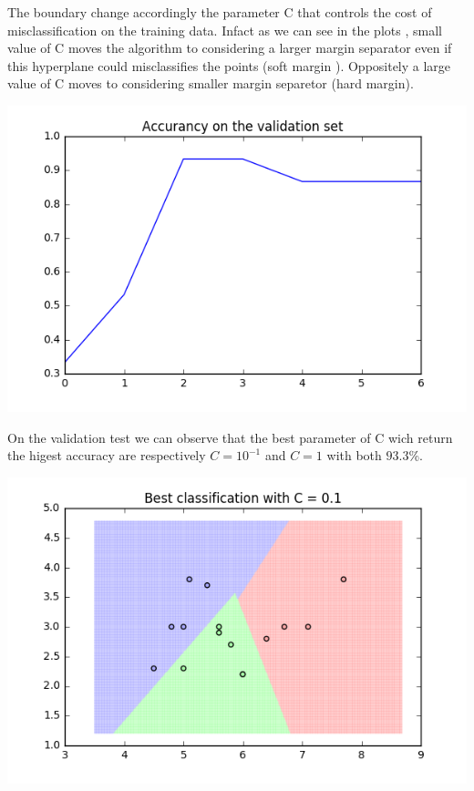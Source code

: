 \documentclass[11pt]{article}
\theoremstyle{plain}
\begin{document}
The boundary change accordingly the parameter C that controls the cost of misclassification on the training data. Infact as we can see in the plots , small value of C moves the algorithm to considering a larger margin separator even if this hyperplane could misclassifies the points (soft margin ). Oppositely a large value of C moves to considering smaller margin separetor (hard margin).



\begin{center}
\includegraphics[scale=0.5]{1}
\end{center}

On the validation test we can observe that the best parameter of C wich return the higest accuracy are respectively $C=10^{-1}$ and $C=1$ with both $93.3$\%.



\begin{center}
\includegraphics[scale=0.5]{2}
\end{center}
\end{document}
